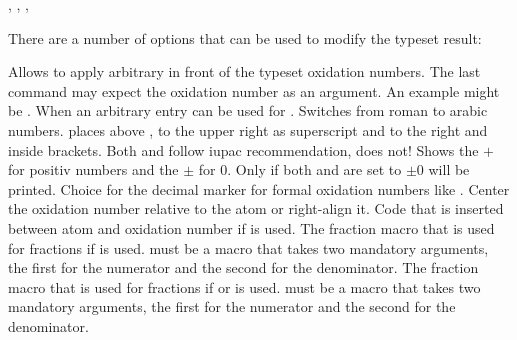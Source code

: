 \documentclass{chemmacros-manual}
\begin{document}
\begin{example}
  , , , 
\end{example}

There are a number of options that can be used to modify the typeset result:
\begin{options}
    Allows to apply arbitrary  in front of the
    typeset oxidation numbers.  The last command may expect the oxidation
    number as an argument.  An example might be .
    When  an arbitrary entry can be used for .
    Switches from roman to arabic numbers.
     places  above ,  to the
    upper right as superscript and  to the right and inside
    brackets.  Both  and  follow \ac{iupac}
    recommendation,  does not!
    Shows the $+$ for positiv numbers and the $\pm$ for $0$.
    Only if both  and
     are set to  $\pm0$ will be
    printed.
    Choice for the decimal marker for formal oxidation numbers like .
    Center the oxidation number relative to the atom or right-align it.
  \Default{\cs*{,}}
    Code that is inserted between atom and oxidation number if
     is used.
    The fraction macro that is used for fractions if  is
    used.   must be a macro that takes two mandatory arguments, the
    first for the numerator and the second for the denominator.
    The fraction macro that is used for fractions if  or
     is used.   must be a macro that takes two
    mandatory arguments, the first for the numerator and the second for the
    denominator.
\end{options}
\end{document}
